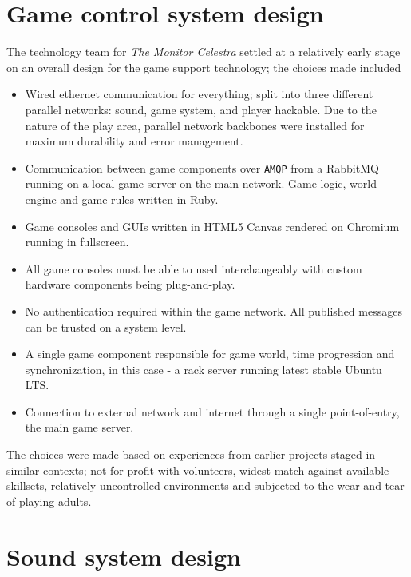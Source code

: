 
\section{Game control system design}
\label{sec:game-control-system}

The technology team for \emph{The Monitor Celestra} settled at a
relatively early stage on an overall design for the game support
technology; the choices made included
\begin{itemize}
\item Wired ethernet communication for everything; split into three
  different parallel networks: sound, game system, and player hackable. Due to the nature of the 
  play area, parallel network backbones were installed for maximum durability and error management.
\item Communication between game components over \texttt{AMQP} from a RabbitMQ running on a local
game server on the main network. Game logic, world engine and game rules written in Ruby.
\item Game consoles and GUIs written in HTML5 Canvas rendered on Chromium running in fullscreen.
\item All game consoles must be able to used interchangeably with custom hardware components being plug-and-play.
\item No authentication required within the game network. All published messages can be trusted on a system level. 
\item A single game component responsible for game world, time progression and synchronization, in this case - a rack server running latest stable Ubuntu LTS. 
\item Connection to external network and internet through a single point-of-entry, the main game server. 
\end{itemize}

The choices were made based on experiences from earlier projects staged
in similar contexts; not-for-profit with volunteers, widest match against available skillsets, relatively uncontrolled environments
and subjected to the wear-and-tear of playing adults.


\section{Sound system design}
\label{sec:sound-system-design}

